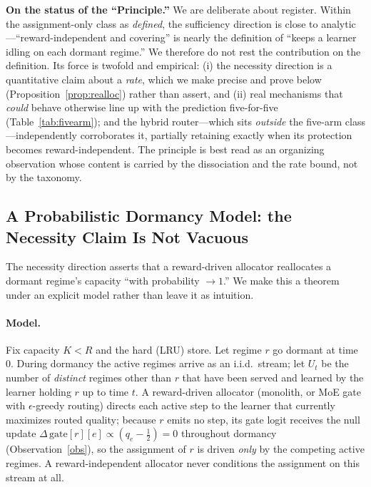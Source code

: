 \documentclass[10pt]{article}
\begin{document}
\noindent\textbf{On the status of the ``Principle.''} We are deliberate about
register. Within the assignment-only class as \emph{defined}, the sufficiency
direction is close to analytic---``reward-independent and covering'' is nearly the
definition of ``keeps a learner idling on each dormant regime.'' We therefore do
not rest the contribution on the definition. Its force is twofold and empirical:
(i) the necessity direction is a quantitative claim about a \emph{rate}, which we
make precise and prove below (Proposition~\ref{prop:realloc}) rather than assert,
and (ii) real mechanisms that \emph{could} behave otherwise line up with the
prediction five-for-five (Table~\ref{tab:fivearm}); and the hybrid router---which
sits \emph{outside} the five-arm class---independently corroborates it, partially
retaining exactly when its protection becomes reward-independent. The principle is best read as an organizing observation
whose content is carried by the dissociation and the rate bound, not by the
taxonomy.

\subsection{A Probabilistic Dormancy Model: the Necessity Claim Is Not Vacuous}
\label{sec:dormancy}

The necessity direction asserts that a reward-driven allocator reallocates a
dormant regime's capacity ``with probability $\to 1$.'' We make this a theorem
under an explicit model rather than leave it as intuition.

\paragraph{Model.} Fix capacity $K<R$ and the hard (LRU) store. Let regime $r$ go
dormant at time $0$. During dormancy the active regimes arrive as an i.i.d.\
stream; let $U_t$ be the number of \emph{distinct} regimes other than $r$ that have
been served and learned by the learner holding $r$ up to time $t$. A reward-driven
allocator (monolith, or MoE gate with $\epsilon$-greedy routing) directs each
active step to the learner that currently maximizes routed quality; because $r$
emits no step, its gate logit receives the null update
$\Delta\,\mathrm{gate}[r][e]\propto(q_e-\tfrac12)=0$ throughout dormancy
(Observation~\ref{obs}), so the assignment of $r$ is driven \emph{only} by the
competing active regimes. A reward-independent allocator never conditions the
assignment on this stream at all.
\end{document}
